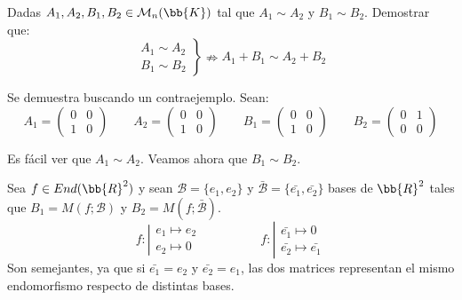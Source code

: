\begin{ejercicio}
    Dadas $A_1,A_2,B_1,B_2 \in \mathcal{M}_n(\bb{K})$ tal que $A_1 \sim A_2$ y $B_1\sim B_2$. Demostrar que:
    \begin{equation*}
        \left.\begin{array}{c}
             A_1 \sim A_2  \\
             B_1\sim B_2 
        \end{array}\right\} \nRightarrow A_1+B_1 \sim A_2 + B_2
    \end{equation*}

    Se demuestra buscando un contraejemplo. Sean:
    \begin{equation*}
        A_1 = \left( \begin{array}{cc}
            0 & 0 \\
            1 & 0
        \end{array} \right) \qquad
        A_2 = \left( \begin{array}{cc}
            0 & 0 \\
            1 & 0
        \end{array} \right) \qquad
        B_1 = \left( \begin{array}{cc}
            0 & 0 \\
            1 & 0
        \end{array} \right) \qquad
        B_2 = \left( \begin{array}{cc}
            0 & 1 \\
            0 & 0
        \end{array} \right)
    \end{equation*}

    Es fácil ver que $A_1 \sim A_2$. Veamos ahora que $B_1 \sim B_2$.

    Sea $f\in End(\bb{R}^2)$ y sean $\mathcal{B}=\{e_1,e_2\}$ y $ \bar{\mathcal{B}} = \{\bar{e_1}, \bar{e_2}\}$ bases de $\bb{R}^2$ tales que $B_1 = M(f;\mathcal{B})$ y $B_2 = M(f;\bar{\mathcal{B}})$.
    \begin{equation*}
        f:\left| \begin{array}{c}
            e_1 \longmapsto e_2 \\
            e_2 \longmapsto 0 
        \end{array} \right. \hspace{2cm}
        f:\left| \begin{array}{cc}
            \bar{e_1} \longmapsto 0 \\
            \bar{e_2} \longmapsto \bar{e_1} 
        \end{array} \right.
    \end{equation*}
    Son semejantes, ya que si $\bar{e_1} = e_2$ y $\bar{e_2} = e_1$, las dos matrices representan el mismo endomorfismo respecto de distintas bases.


\end{ejercicio}
